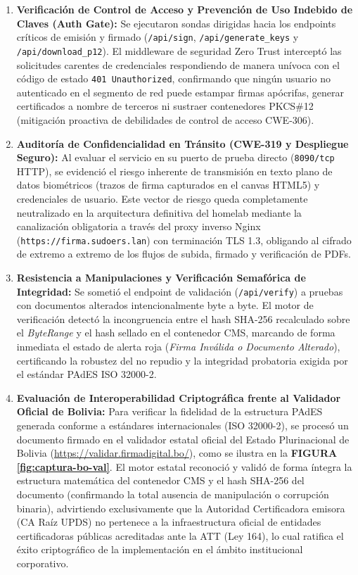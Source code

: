 \begin{enumerate}
  \item \textbf{Verificación de Control de Acceso y Prevención de Uso Indebido de Claves (Auth Gate):}
  Se ejecutaron sondas dirigidas hacia los endpoints críticos de emisión y firmado (\texttt{/api/sign}, \texttt{/api/generate\_keys} y \texttt{/api/download\_p12}). El middleware de seguridad Zero Trust interceptó las solicitudes carentes de credenciales respondiendo de manera unívoca con el código de estado \texttt{401 Unauthorized}, confirmando que ningún usuario no autenticado en el segmento de red puede estampar firmas apócrifas, generar certificados a nombre de terceros ni sustraer contenedores PKCS\#12 (mitigación proactiva de debilidades de control de acceso CWE-306).

  \item \textbf{Auditoría de Confidencialidad en Tránsito (CWE-319 y Despliegue Seguro):}
  Al evaluar el servicio en su puerto de prueba directo (\texttt{8090/tcp} HTTP), se evidenció el riesgo inherente de transmisión en texto plano de datos biométricos (trazos de firma capturados en el canvas HTML5) y credenciales de usuario. Este vector de riesgo queda completamente neutralizado en la arquitectura definitiva del homelab mediante la canalización obligatoria a través del proxy inverso Nginx (\texttt{https://firma.sudoers.lan}) con terminación TLS 1.3, obligando al cifrado de extremo a extremo de los flujos de subida, firmado y verificación de PDFs.

  \item \textbf{Resistencia a Manipulaciones y Verificación Semafórica de Integridad:}
  Se sometió el endpoint de validación (\texttt{/api/verify}) a pruebas con documentos alterados intencionalmente byte a byte. El motor de verificación detectó la incongruencia entre el hash SHA-256 recalculado sobre el \textit{ByteRange} y el hash sellado en el contenedor CMS, marcando de forma inmediata el estado de alerta roja (\textit{Firma Inválida o Documento Alterado}), certificando la robustez del no repudio y la integridad probatoria exigida por el estándar PAdES ISO 32000-2.

  \item \textbf{Evaluación de Interoperabilidad Criptográfica frente al Validador Oficial de Bolivia:}
  Para verificar la fidelidad de la estructura PAdES generada conforme a estándares internacionales (ISO 32000-2), se procesó un documento firmado en el validador estatal oficial del Estado Plurinacional de Bolivia (\url{https://validar.firmadigital.bo/}), como se ilustra en la \textbf{FIGURA \ref{fig:captura-bo-val}}. El motor estatal reconoció y validó de forma íntegra la estructura matemática del contenedor CMS y el hash SHA-256 del documento (confirmando la total ausencia de manipulación o corrupción binaria), advirtiendo exclusivamente que la Autoridad Certificadora emisora (CA Raíz UPDS) no pertenece a la infraestructura oficial de entidades certificadoras públicas acreditadas ante la ATT (Ley 164), lo cual ratifica el éxito criptográfico de la implementación en el ámbito institucional corporativo.
\end{enumerate}

